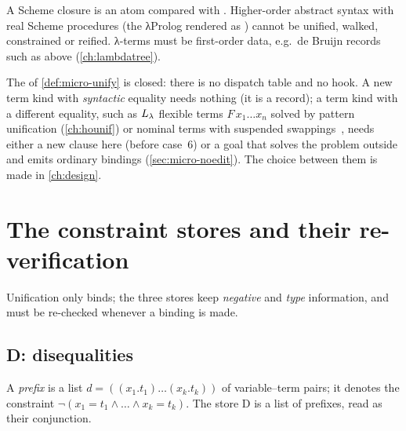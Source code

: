 \begin{pitfall}
A Scheme closure is an atom compared with . Higher-order abstract syntax with real Scheme
procedures (the λProlog  rendered as ) cannot be unified, walked,
constrained or reified. λ-terms must be first-order data, e.g.\ de Bruijn records such as 
above (\cref{ch:lambdatree}).
\end{pitfall}

\begin{kanren}
The  of \cref{def:micro-unify} is closed: there is no dispatch table and no hook. A new term
kind with \emph{syntactic} equality needs nothing (it is a record); a term kind with a different
equality, such as $L_\lambda$ flexible terms $F\,x_1\dots x_n$ solved by pattern unification
(\cref{ch:hounif}) or nominal terms with suspended swappings~\cite{ByrdFriedman2007,UrbanPittsGabbay2004},
needs either a new clause here (before case~6) or a goal that solves the problem outside and emits
ordinary bindings (\cref{sec:micro-noedit}). The choice between them is made in \cref{ch:design}.
\end{kanren}

\section{The constraint stores and their re-verification}\label{sec:micro-stores}

Unification only binds; the three stores keep \emph{negative} and \emph{type} information, and must
be re-checked whenever a binding is made.

\subsection{D: disequalities}

\begin{definition}[Prefix]\label{def:micro-prefix}
A \emph{prefix} is a list $d = ((x_1 . t_1) \dots (x_k . t_k))$ of variable–term pairs; it denotes
the constraint $\neg(x_1 = t_1 \wedge \dots \wedge x_k = t_k)$. The store D is a list of prefixes,
read as their conjunction.
\end{definition}

